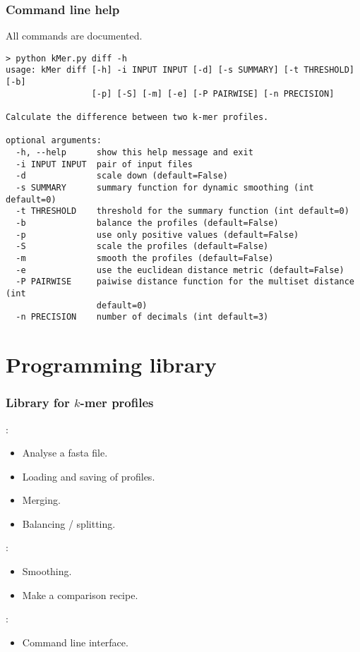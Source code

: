 \documentclass[slidestop]{beamer}
\begin{document}
\begin{frame}[fragile]
  \frametitle{Command line help}

  All commands are documented.
  \bigskip

  \begin{lstlisting}[numbers=none, basicstyle=\tiny, caption={Help for the
     diff option.}, language=none]
> python kMer.py diff -h
usage: kMer diff [-h] -i INPUT INPUT [-d] [-s SUMMARY] [-t THRESHOLD] [-b]
                 [-p] [-S] [-m] [-e] [-P PAIRWISE] [-n PRECISION]

Calculate the difference between two k-mer profiles.

optional arguments:
  -h, --help      show this help message and exit
  -i INPUT INPUT  pair of input files
  -d              scale down (default=False)
  -s SUMMARY      summary function for dynamic smoothing (int default=0)
  -t THRESHOLD    threshold for the summary function (int default=0)
  -b              balance the profiles (default=False)
  -p              use only positive values (default=False)
  -S              scale the profiles (default=False)
  -m              smooth the profiles (default=False)
  -e              use the euclidean distance metric (default=False)
  -P PAIRWISE     paiwise distance function for the multiset distance (int
                  default=0)
  -n PRECISION    number of decimals (int default=3)

  \end{lstlisting}
\end{frame}

\section{Programming library}
\begin{frame}
  \frametitle{Library for $k$-mer profiles}

  :
  \begin{itemize}
    \item Analyse a fasta file.
    \item Loading and saving of profiles.
    \item Merging.
    \item Balancing / splitting.
  \end{itemize}
  \bigskip
  \pause

  :
  \begin{itemize}
    \item Smoothing.
    \item Make a comparison recipe.
  \end{itemize}
  \bigskip
  \pause

  :
  \begin{itemize}
    \item Command line interface.
  \end{itemize}
\end{frame}
\end{document}
